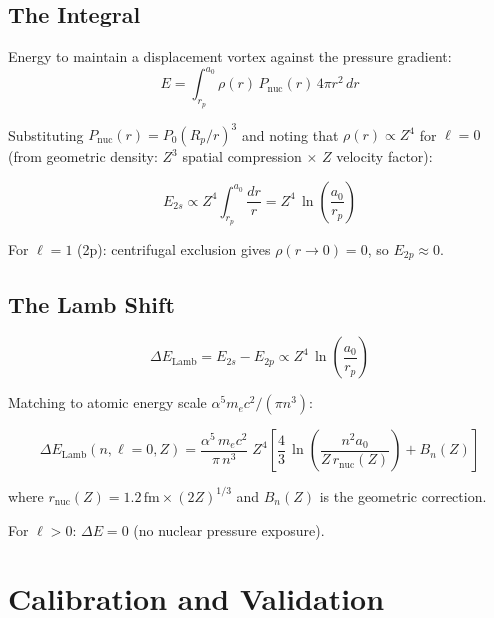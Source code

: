\subsection{The Integral}

Energy to maintain a displacement vortex against the pressure gradient:
\begin{equation}
  E = \int_{r_p}^{a_0} \rho(r)\,P_{\text{nuc}}(r)\,4\pi r^2\,dr
\end{equation}

Substituting $P_{\text{nuc}}(r) = P_0(R_p/r)^3$ and noting that $\rho(r) \propto Z^4$ for $\ell = 0$ (from geometric density: $Z^3$ spatial compression $\times$ $Z$ velocity factor):

\begin{equation}
  E_{2s} \propto Z^4 \int_{r_p}^{a_0} \frac{dr}{r} = Z^4\,\ln\!\left(\frac{a_0}{r_p}\right)
\end{equation}

For $\ell = 1$ (2p): centrifugal exclusion gives $\rho(r \to 0) = 0$, so $E_{2p} \approx 0$.

\subsection{The Lamb Shift}

\begin{equation}
  \Delta E_{\text{Lamb}} = E_{2s} - E_{2p} \propto Z^4\,\ln\!\left(\frac{a_0}{r_p}\right)
\end{equation}

Matching to atomic energy scale $\alpha^5 m_e c^2/(\pi n^3)$:

\begin{equation}\label{eq:lamb-master}
  \boxed{
    \Delta E_{\text{Lamb}}(n, \ell{=}0, Z) = \frac{\alpha^5\,m_e c^2}{\pi\,n^3}\;Z^4
      \left[\frac{4}{3}\,\ln\!\left(\frac{n^2 a_0}{Z\,r_{\text{nuc}}(Z)}\right) + B_n(Z)\right]
  }
\end{equation}

where $r_{\text{nuc}}(Z) = 1.2\,\text{fm} \times (2Z)^{1/3}$ and $B_n(Z)$ is the geometric correction.

For $\ell > 0$: $\Delta E = 0$ (no nuclear pressure exposure).


\section{Calibration and Validation}

